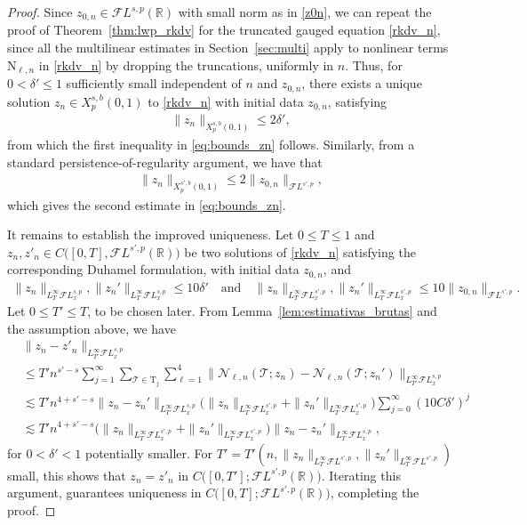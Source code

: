 \documentclass[a4paper,
11pt,  reqno]{amsart}
\newcommand{\5}{\textup{V}}
\newcommand{\FL}{\mathcal{F} L}
\newcommand{\les}{\lesssim}
\newcommand{\dl}{\delta}
\theoremstyle{remark}
\newcommand{\R}{\mathbb{R}}
\newcommand{\TT}{\mathcal{T}}
\newcommand{\Tr}{\mathrm{T}}
\renewcommand{\l}{\ell}
\numberwithin{equation}{section}
\numberwithin{theorem}{section}
\newcommand{\NN}{\mathrm{N}}
\newcommand{\Ncal}{\mathcal{N}}
\begin{document}
\begin{proof}

Since $z_{0,n} \in \FL^{s,p}(\R)$ with small norm as in \eqref{z0n}, we can repeat the proof of Theorem~\ref{thm:lwp_rkdv} for the truncated gauged equation \eqref{rkdv_n}, since all the multilinear estimates in Section~\ref{sec:multi} apply to nonlinear terms $\NN_{\l, n}$ in \eqref{rkdv_n} by dropping the truncations, uniformly in $n$. Thus, for $0 < \dl' \le 1$ sufficiently small independent of $n$ and $z_{0,n}$, there exists a unique solution $z_n \in X^{s, b}_p(0,1)$ to \eqref{rkdv_n} with initial data $z_{0,n}$, satisfying
\begin{align}
\| z_n \|_{X^{s,b}_p(0,1)} \le 2 \dl ',
\end{align}
from which the first inequality in \eqref{eq:bounds_zn} follows. Similarly, from a standard persistence-of-regularity argument, we have that
\begin{align*}
\| z_n \|_{X^{s',b}_p (0,1)} \le 2 \| z_{0,n} \|_{\FL^{s',p}},
\end{align*}
which gives the second estimate in  \eqref{eq:bounds_zn}.

\smallskip

It remains to establish the improved uniqueness. Let $0\le T\le 1$ and $z_n,z'_n\in C\big([0,T], \FL^{s',p}(\R)\big)$ be two solutions of \eqref{rkdv_n} satisfying the corresponding Duhamel formulation, with initial data $z_{0,n}$, and
\begin{align*}
\| z_n \|_{L^\infty_T \FL^{s,p}_x} , \| z_n' \|_{L^\infty_T  \FL^{s,p}_x} \le 10 \dl'
\quad
\text{and}
\quad
\| z_n \|_{L^\infty_T \FL^{s',p}_x} , \| z_n' \|_{L^\infty_T  \FL^{s',p}_x} \le 10 \| z_{0,n} \|_{\FL^{s',p}}.
\end{align*}
Let $0\le T'\le T $, to be chosen later. From Lemma~\ref{lem:estimativas_brutas} and the assumption above, we have
	\begin{align*}
&
\|z_n-z'_n\|_{L^\infty_{T'}\FL^{s,p}_x}
\\
&
\le
T' n^{s'-s} \sum_{j=1}^\infty \sum_{\TT \in \Tr_j} \sum_{\l=1}^4 \big\| \Ncal_{\l, n}(\TT; z_n) - \Ncal_{\l, n} (\TT; z_n') \big\|_{L^\infty_{T'} \FL^{s,p}_x}
\\
&
\les T' n^{4 + s'-s} \|z_n - z_n' \|_{L^\infty_{T'} \FL^{s,p}_x}
\big(
\| z_n \|_{L^\infty_T  \FL^{s',p}_x}
+
\| z_n' \|_{L^\infty_T  \FL^{s',p}_x}
\big)
\sum_{j=0}^\infty (10 C \dl')^j
\\&\les T' n^{4+s'-s}\big(
\| z_n \|_{L^\infty_T  \FL^{s',p}_x}
+
\| z_n' \|_{L^\infty_T  \FL^{s',p}_x}
\big)
 \|z_n - z_n' \|_{L^\infty_T \FL^{s,p}_x}
,
	\end{align*}
for $0<\dl'<1 $ potentially smaller.
For $T'  = T'(n, \|z_{n}\|_{L^\infty_T \FL^{s',p}}, \|z_{n}'\|_{L^\infty_T \FL^{s',p}}) $ small, this shows that $z_n=z'_n$ in $C\big([0,T']; \FL^{s',p}(\R) \big)$. Iterating this argument, guarantees uniqueness in $C\big([0,T] ; \FL^{s',p}(\R)\big)$, completing the proof. \qedhere

\end{proof}
\end{document}
